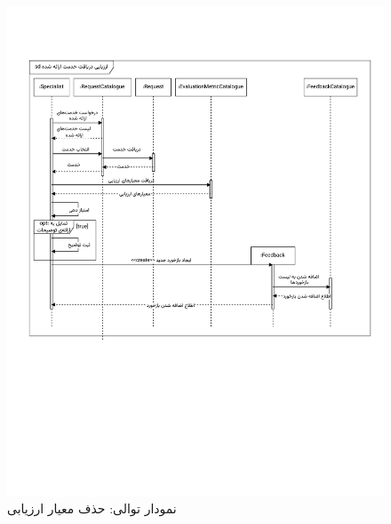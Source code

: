 \begin{figure}[ht!]
	\centering
	\includegraphics[scale=0.8, page=5]{figs/OOD-Sequence-3.pdf}
	\caption{نمودار توالی: حذف معیار ارزیابی}
\end{figure}
\FloatBarrier
\newpage

